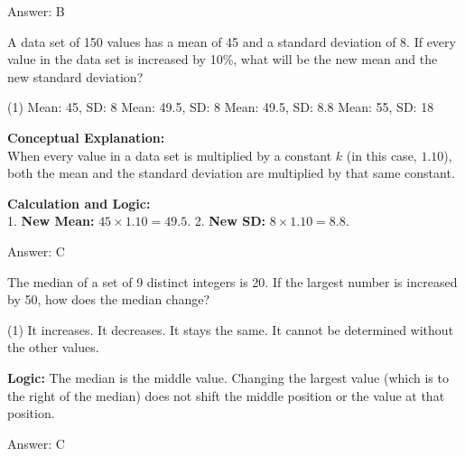 \documentclass[11pt,paper=a4,answers]{exam}
\begin{document}
\begin{questions}
\begin{solution}
\vspace{30pt}

Answer: \colorbox{yellow!100}{B}
\end{solution}

\question
A data set of 150 values has a mean of 45 and a standard deviation of 8. If every value in the data set is increased by 10\%, what will be the new mean and the new standard deviation?
\begin{tasks}(1)
    \task Mean: 45, SD: 8
    \task Mean: 49.5, SD: 8
    \task Mean: 49.5, SD: 8.8
    \task Mean: 55, SD: 18
\end{tasks}

\begin{solution}
\textbf{Conceptual Explanation:} \\
When every value in a data set is multiplied by a constant $k$ (in this case, $1.10$), both the mean and the standard deviation are multiplied by that same constant.

\vspace{30pt}

\textbf{Calculation and Logic:} \\
1. \textbf{New Mean:} $45 \times 1.10 = 49.5$.
2. \textbf{New SD:} $8 \times 1.10 = 8.8$.

\vspace{30pt}

Answer: \colorbox{yellow!100}{C}
\end{solution}

\vspace{60pt}

\question
The median of a set of 9 distinct integers is 20. If the largest number is increased by 50, how does the median change?
\begin{tasks}(1)
    \task It increases.
    \task It decreases.
    \task It stays the same.
    \task It cannot be determined without the other values.
\end{tasks}

\begin{solution}
\textbf{Logic:} The median is the middle value. Changing the largest value (which is to the right of the median) does not shift the middle position or the value at that position.

\vspace{30pt}

Answer: \colorbox{yellow!100}{C}
\end{solution}


\end{questions}
\end{document}
